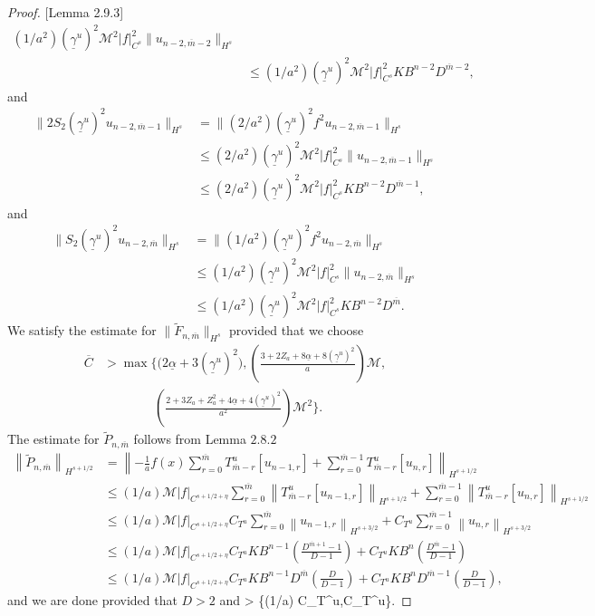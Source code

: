 \begin{proof}{[Lemma 2.9.3]}
\begin{align*}
(1/a^2)(\underline{\gamma}^u)^2\mathcal{M}^2|f|_{C^{s}}^2\|u_{n-2, \overline{m}-2}\|_{H^{s}}\\&\le
(1/a^2)(\underline{\gamma}^u)^2\mathcal{M}^2|f|_{C^{s}}^2KB^{n-2}D^{\overline{m}-2},
\end{align*}
and
\begin{align*}
\|2S_2(\underline{\gamma}^u)^2u_{n-2,\overline{m}-1}\|_{H^{s}}&=\|(2/a^2)(\underline{\gamma}^u)^2f^2u_{n-2,\overline{m}-1}\|_{H^{s}}\\&\le
(2/a^2)(\underline{\gamma}^u)^2\mathcal{M}^2|f|_{C^{s}}^2\|u_{n-2, \overline{m}-1}\|_{H^{s}}\\&\le
(2/a^2)(\underline{\gamma}^u)^2\mathcal{M}^2|f|_{C^{s}}^2KB^{n-2}D^{\overline{m}-1},
\end{align*}
and
\begin{align*}
\|S_2(\underline{\gamma}^u)^2u_{n-2,\overline{m}}\|_{H^{s}}&=\|(1/a^2)(\underline{\gamma}^u)^2f^2u_{n-2,\overline{m}}\|_{H^{s}}\\&\le
(1/a^2)(\underline{\gamma}^u)^2\mathcal{M}^2|f|_{C^{s}}^2\|u_{n-2, \overline{m}}\|_{H^{s}}\\&\le
(1/a^2)(\underline{\gamma}^u)^2\mathcal{M}^2|f|_{C^{s}}^2KB^{n-2}D^{\overline{m}}.
\end{align*}
We satisfy the estimate for $\|\tilde{F}_{n,\overline{m}}\|_{H^{s}}$ provided that we choose
\begin{align*}\overline{C} &> \max\Bigg\{\bigg(2\underline{\alpha}+3(\underline{\gamma}^u)^2\bigg),\left(\frac{3+2Z_a+8\underline{\alpha}+8(\underline{\gamma}^u)^2}{a}\right)\mathcal{M},\\&\qquad\qquad\left(\frac{2+3Z_a+Z^2_a+4\underline{\alpha}+4(\underline{\gamma}^u)^2}{a^2} \right)\mathcal{M}^2    \Bigg\}.\end{align*}
The estimate for $\tilde{P}_{n,\overline{m}}$ follows from Lemma $2.8.2$
\begin{align*}
\left\|\tilde{P}_{n,\overline{m}}\right\|_{H^{s+1/2}}&=\left\|-\frac{1}{a} f(x) \sum_{r=0}^{\overline{m}} T^u_{\overline{m}-r}\left[u_{n-1,r}\right] + \sum_{r=0}^{\overline{m}-1}T_{\overline{m}-r}^u\left[u_{n,r}\right]\right\|_{H^{s+1/2}}\\&\le
(1/a)\mathcal{M}|f|_{C^{s+1/2+\eta}}\sum_{r=0}^{\overline{m}}\left\|T^u_{\overline{m}-r}\left[u_{n-1,r}\right]\right\|_{H^{s+1/2}}+
\sum_{r=0}^{\overline{m}-1}\left\|T^u_{\overline{m}-r}\left[u_{n,r}\right]\right\|_{H^{s+1/2}}
\\&\le
(1/a)\mathcal{M}|f|_{C^{s+1/2+\eta}}C_{T^u}\sum_{r=0}^{\overline{m}}\left\|u_{n-1,r}\right\|_{H^{s+3/2}}+
C_{T^u}\sum_{r=0}^{\overline{m}-1}\left\|u_{n,r}\right\|_{H^{s+3/2}}
\\&\le
(1/a)\mathcal{M}|f|_{C^{s+1/2+\eta}} C_{T^u} KB^{n-1}\left(\frac{D^{\overline{m}+1}-1}{D-1}\right) + C_{T^u}KB^{n}\left(\frac{D^{\overline{m}}-1}{D-1}\right)
\\&\le
(1/a)\mathcal{M}|f|_{C^{s+1/2+\eta}} C_{T^u} KB^{n-1}D^{\overline{m}}\left(\frac{D}{D-1}\right) + C_{T^u}KB^{n}D^{\overline{m}-1}\left(\frac{D}{D-1}\right),
\end{align*}
and we are done provided that $D>2$ and 
\bes
{} > \max\big\{(1/a) C_{T^u},C_{T^u}\big\}.
\qedhere
\ees
\end{proof}
